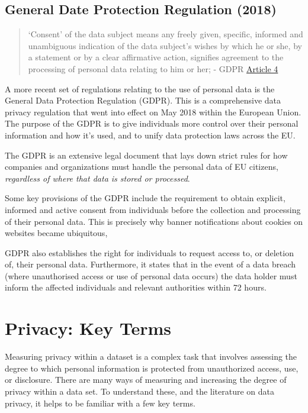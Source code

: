 \documentclass[
  letterpaper,
  DIV=11,
  numbers=noendperiod]{scrreprt}
\begin{document}
\subsection{General Date Protection Regulation
(2018)}\label{general-date-protection-regulation-2018}

\begin{quote}
`Consent' of the data subject means any freely given, specific, informed
and unambiguous indication of the data subject's wishes by which he or
she, by a statement or by a clear affirmative action, signifies
agreement to the processing of personal data relating to him or her; -
GDPR \href{https://gdpr-info.eu/art-4-gdpr/}{Article 4}
\end{quote}

A more recent set of regulations relating to the use of personal data is
the General Data Protection Regulation (GDPR). This is a comprehensive
data privacy regulation that went into effect on May 2018 within the
European Union. The purpose of the GDPR is to give individuals more
control over their personal information and how it's used, and to unify
data protection laws across the EU.

The GDPR is an extensive legal document that lays down strict rules for
how companies and organizations must handle the personal data of EU
citizens, \emph{regardless of where that data is stored or processed}.

Some key provisions of the GDPR include the requirement to obtain
explicit, informed and active consent from individuals before the
collection and processing of their personal data. This is precisely why
banner notifications about cookies on websites became ubiquitous,

GDPR also establishes the right for individuals to request access to, or
deletion of, their personal data. Furthermore, it states that in the
event of a data breach (where unauthorised access or use of personal
data occurs) the data holder must inform the affected individuals and
relevant authorities within 72 hours.

\section{Privacy: Key Terms}\label{privacy-key-terms}

Measuring privacy within a dataset is a complex task that involves
assessing the degree to which personal information is protected from
unauthorized access, use, or disclosure. There are many ways of
measuring and increasing the degree of privacy within a data set. To
understand these, and the literature on data privacy, it helps to be
familiar with a few key terms.
\end{document}
